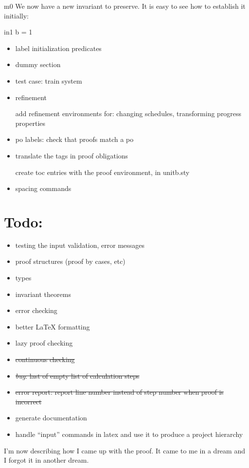 \documentclass[12pt]{amsart}
\begin{document}
\begin{machine}{m0}
We now have a new invariant to preserve. It is easy to see how to establish it initially:
%
\begin{initialization}{in1}
	b = 1
\end{initialization}

\begin{itemize}
\item label initialization predicates
\item dummy section
\item test case: train system
\item refinement

	add refinement environments for: changing schedules, transforming progress properties
\item po labels: check that proofs match a po
\item translate the tags in proof obligations
	
	create toc entries with the proof environment, in unitb.sty
\item spacing commands
\end{itemize}

\section{Todo:}
\begin{itemize}
\item testing the input validation, error messages
\item proof structures (proof by cases, etc)
\item types
\item invariant theorems
\item error checking
\item better LaTeX formatting
\item lazy proof checking
\item \sout{continuous checking}
\item \sout{\emph{bug}: last of empty list of calculation steps}
\item \sout{error report: report line number instead of step number when proof is incorrect}
\item generate documentation
\item handle ``input'' commands in latex and use it to produce a project hierarchy
\end{itemize}

I'm now describing how I came up with the proof. It came to me in a dream and I forgot it in another dream.


\end{machine}
\end{document}
